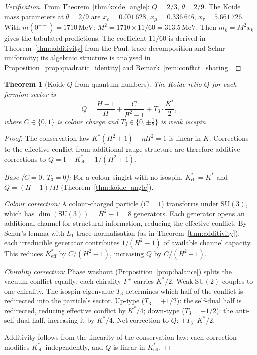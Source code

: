\documentclass[11pt,a4paper]{article}
\newtheorem{theorem}{Theorem}[section]
\theoremstyle{definition}
\theoremstyle{remark}
\newcommand{\SU}{\mathrm{SU}}
\begin{document}
\begin{proof}[Verification]
From Theorem~\ref{thm:koide_angle}: $Q=2/3$, $\theta=2/9$. The Koide mass parameters at $\theta=2/9$ are $x_e=0.001\,628$, $x_\mu=0.336\,646$, $x_\tau=5.661\,726$. With $m(0^{++})=1710\,\mathrm{MeV}$: $M^2=1710\times 11/60=313.5\,\mathrm{MeV}$. Then $m_k=M^2 x_k$ gives the tabulated predictions. The coefficient $11/60$ is derived in Theorem~\ref{thm:additivity} from the Pauli trace decomposition and Schur uniformity; its algebraic structure is analysed in Proposition~\ref{prop:quadratic_identity} and Remark~\ref{rem:conflict_sharing}.
\end{proof}

\begin{theorem}[Koide $Q$ from quantum numbers]\label{thm:koide_Q}
The Koide ratio $Q$ for each fermion sector is
\begin{equation}\label{eq:Q_formula}
Q = \frac{H-1}{H} + \frac{C}{H^2-1} + T_3\cdot\frac{K^*}{2},
\end{equation}
where $C\in\{0,1\}$ is colour charge and $T_3\in\{0,\pm\tfrac{1}{2}\}$ is weak isospin.
\end{theorem}

\begin{proof}
The conservation law $K^*(H^2+1)-\eta H^2=1$ is linear in $K$. Corrections to the effective conflict from additional gauge structure are therefore additive corrections to $Q=1-K^*_{\mathrm{eff}}-1/(H^2+1)$.

\emph{Base ($C=0$, $T_3=0$):} For a colour-singlet with no isospin, $K^*_{\mathrm{eff}}=K^*$ and $Q=(H-1)/H$ (Theorem~\ref{thm:koide_angle}).

\emph{Colour correction:} A colour-charged particle ($C=1$) transforms under $\SU(3)$, which has $\dim(\SU(3))=H^2-1=8$ generators. Each generator opens an additional channel for structural information, reducing the effective conflict. By Schur's lemma with $L_1$ trace normalisation (as in Theorem~\ref{thm:additivity}): each irreducible generator contributes $1/(H^2-1)$ of available channel capacity. This reduces $K^*_{\mathrm{eff}}$ by $C/(H^2-1)$, increasing $Q$ by $C/(H^2-1)$.

\emph{Chirality correction:} Phase washout (Proposition~\ref{prop:balance}) splits the vacuum conflict equally: each chirality $F^\pm$ carries $K^*/2$. Weak $\SU(2)$ couples to one chirality. The isospin eigenvalue $T_3$ determines which half of the conflict is redirected into the particle's sector. Up-type ($T_3=+1/2$): the self-dual half is redirected, reducing effective conflict by $K^*/4$; down-type ($T_3=-1/2$): the anti-self-dual half, increasing it by $K^*/4$. Net correction to $Q$: $+T_3\cdot K^*/2$.

Additivity follows from the linearity of the conservation law: each correction modifies $K^*_{\mathrm{eff}}$ independently, and $Q$ is linear in $K^*_{\mathrm{eff}}$.
\end{proof}
\end{document}

